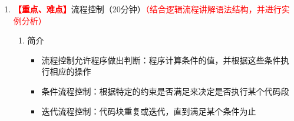 \documentclass{TIJMUjiaoanLL}
\begin{document}
\begin{enumerate}
\begin{enumerate}
\begin{multicols}{2}
\begin{enumerate}
\begin{itemize}
	      \item 多行注释的每行开头都要有\#
	      \item 行中间可以插入\#添加注释
	    \end{itemize}
	  \item 注释内容
	    \begin{itemize}
	      \item 脚本的基本信息
	      \item 脚本的修改日志
	      \item 脚本每个部分的作用
	      \item 由用户添加的数据
	    \end{itemize}
	\end{enumerate}
	\end{multicols}
	\vspace*{-10pt}
      \item 变量使用
	\begin{itemize}
	  \item 赋值：使用=（赋值运算符），=两边不能有空格，在=后面跟一个换行符赋空值
	  \item 访问：默认情况下将变量视作文本字符串，在变量名前加\$可以访问变量的值
	  \item 变量名：只能包含字母、数字和下划线，必须以字母或下划线开头，大小写敏感（惯例使用大写）
	\end{itemize}
      \item 从键盘读取输入：使用read读取键盘输入并为变量赋值
      \item 特殊变量
      \item 退出状态：0表示成功，1表示不成功
    \end{enumerate}

  \item
    \textcolor{red}{\textbf{【重点、难点】}}流程控制（20分钟）\textcolor{red}{（结合逻辑流程讲解语法结构，并进行实例分析）}
    \begin{enumerate}
      \item 简介
	\begin{itemize}
	  \item 流程控制允许程序做出判断：程序计算条件的值，并根据这些条件执行相应的操作
          \item 条件流程控制：根据特定的约束是否满足来决定是否执行某个代码段
          \item 迭代流程控制：代码块重复或迭代，直到满足某个条件为止
	\end{itemize}


\end{enumerate}
\end{enumerate}
\end{document}
